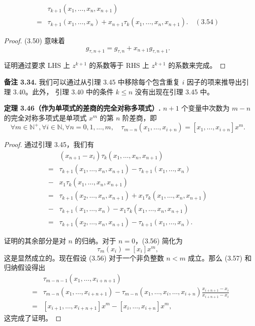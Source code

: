 \documentclass[a4paper]{ctexart}
\begin{document}
{\begin{align*}
&\tau_{k+1}\left(x_1, \ldots, x_n, x_{n+1}\right) \\
=&\tau_{k+1}\left(x_1, \ldots, x_n\right)+x_{n+1}\tau_k\left(x_1, \ldots, x_n, x_{n+1}\right). \quad (3.54)
\end{align*}

\begin{proof}
  (3.50) 意味着
  \[
  g_{\tau, n+1} = g_{\tau, n} + x_{n+1} g_{\tau, n+1}.
  \tag{3.555}
  \]
  
证明通过要求 LHS 上 $z^{k+1}$ 的系数等于 RHS 上 $z^{k+1}$ 的系数来完成。    
\end{proof} 

\noindent \textbf{备注 3.34.} 我们可以通过从引理 3.45 中移除每个包含重复 
$i$ 因子的项来推导出引理 3.40。此外，
引理 3.40 中的条件 $k \leq n$ 没有出现在引理 3.45 中。

\noindent \textbf{定理 3.46（作为单项式的差商的完全对称多项式）.} 
$n+1$ 个变量中次数为 $m-n$ 的完全对称多项式是单项式 $x^m$ 的第 $n$ 阶差商，即
\[
\forall m \in \mathbb{N}^+, \forall i \in \mathbb{N}, 
\forall n = 0, 1, \ldots, m, \quad \tau_{m-n}(x_1, \ldots, x_{i+n}) 
= [x_1, \ldots, x_{i+n}] x^m.
\tag{3.56}
\]
\begin{proof}
通过引理 3.45，我们有
\begin{align*}
  &(x_{n+1} - x_i) \tau_k(x_1, \ldots, x_n, x_{n+1}) \\
  =& \tau_{k+1}(x_1, \ldots, x_n, x_{n+1}) - \tau_{k+1}(x_1, \ldots, x_n) \\
  -& x_1 \tau_k(x_1, \ldots, x_n, x_{n+1}) \\
  =& \tau_{k+1}(x_2, \ldots, x_n, x_{n+1}) + x_1 \tau_k(x_1, \ldots, x_n, x_{n+1}) \\
  -& \tau_{k+1}(x_1, \ldots, x_n) - x_1 \tau_k(x_1, \ldots, x_n, x_{n+1}) \\
  =& \tau_{k+1}(x_2, \ldots, x_n, x_{n+1}) - \tau_{k+1}(x_1, \ldots, x_n).
  \tag{3.57}
\end{align*}
  
证明的其余部分是对 $n$ 的归纳。对于 $n = 0$，(3.56) 简化为  
\[
  \tau_m(x_i) = [x_i] x^m,
\]
这是显然成立的。现在假设 (3.56) 对于一个非负整数 $n < m$ 成立。那么 (3.57) 和归纳假设得出
\[
\begin{array}{rcl}
  &&\tau_{m-n-1}(x_1, \ldots, x_{i+n+1})\\ 
  &=& \tau_{m-n}(x_1, \ldots, x_{i+n+1}) 
  - \tau_{m-n}(x_1, \ldots, x_i, \ldots, x_{i+n}) \frac{x_{i+n+1} - x_i}{x_{i+n+1} 
  - x_i} \\
  &=& [x_{i+1}, \ldots, x_{i+n+1}] x^m - [x_i, \ldots, x_{i+n}] x^m,
\end{array}
\]
这完成了证明。
\end{proof}

}
\end{document}
